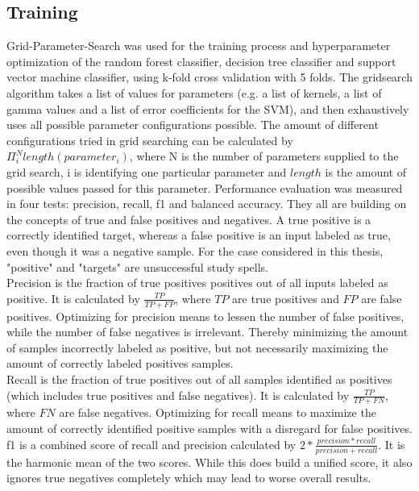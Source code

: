 \FloatBarrier
\subsection{Training}
\label{sec:training}
Grid-Parameter-Search was used for the training process and hyperparameter optimization of the random forest classifier, decision tree classifier and support vector machine classifier, using k-fold cross validation with 5 folds. The gridsearch algorithm takes a list of values for parameters (e.g. a list of kernels, a list of gamma values and a list of error coefficients for the SVM), and then exhaustively uses all possible parameter configurations possible. The amount of different configurations tried in grid searching can be calculated by $\Pi_{i}^N length(parameter_i)$, where N is the number of parameters supplied to the grid search, i is identifying one particular parameter and $length$ is the amount of possible values passed for this parameter. Performance evaluation was measured in four tests: precision, recall, f1 and balanced accuracy. They all are building on the concepts of true and false positives and negatives. A true positive is a correctly identified target, whereas a false positive is an input labeled as true, even though it was a negative sample. For the case considered in this thesis, "positive" and "targets" are unsuccessful study spells.\\
Precision is the fraction of true positives positives out of all inputs labeled as positive. It is calculated by $\frac{TP}{TP+FP}$, where $TP$ are true positives and $FP$ are false positives. Optimizing for precision means to lessen the number of false positives, while the number of false negatives is irrelevant. Thereby minimizing the amount of samples incorrectly labeled as positive, but not necessarily maximizing the amount of correctly labeled positives samples.\\
Recall is the fraction of true positives out of all samples identified as positives (which includes true positives and false negatives). It is calculated by $\frac{TP}{TP+FN}$, where $FN$ are false negatives. Optimizing for recall means to maximize the amount of correctly identified positive samples with a disregard for false positives.\\
f1 is a combined score of recall and precision calculated by $2*\frac{precision * recall}{precision + recall}$. It is the harmonic mean of the two scores. While this does build a unified score, it also ignores true negatives completely which may lead to worse overall results\cite{Powers.2011}.\\

